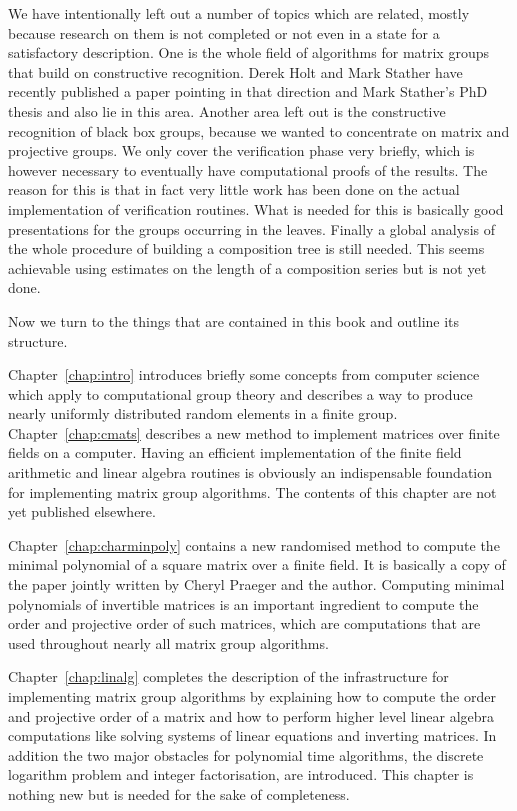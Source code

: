 We have intentionally left out a number of topics which are related, mostly
because research on them is not completed or not even in a state for a
satisfactory description. One is
the whole field of algorithms for matrix groups that build on constructive
recognition. Derek Holt and Mark Stather have recently published a paper
\cite{HoltStather} pointing in that direction and Mark Stather's PhD thesis
\cite{StatherPhd} and \cite{StatherSylow} also lie in this area. 
Another area left out is the
constructive recognition of black box groups, because we wanted to
concentrate on matrix and projective groups. We only cover the
verification phase very briefly, which is however necessary to eventually
have computational proofs of the results. The reason for this is that in
fact very little work has been done on the actual implementation of
verification routines. What is needed for this is basically good
presentations for the groups occurring in the leaves. 
%
Finally a global analysis of the
whole procedure of building a composition tree is still needed. This seems
achievable using estimates on the length of a composition series but is not
yet done.

Now we turn to the things that are contained in this book and
outline its structure. 

Chapter~\ref{chap:intro} introduces briefly some concepts from computer
science which apply to computational group theory and describes a
way to produce nearly uniformly distributed random elements in a
finite group. Chapter~\ref{chap:cmats} describes a new method to
implement matrices over finite fields on a computer. Having an efficient
implementation of the finite field arithmetic and linear algebra
routines is obviously an indispensable foundation for implementing
matrix group algorithms. The contents of this chapter are not yet
published elsewhere.

Chapter~\ref{chap:charminpoly} contains a new randomised method to
compute the minimal polynomial of a square matrix over a finite field.
It is basically a copy of the paper \cite{minpolypaper} jointly
written by Cheryl Praeger and the author. Computing minimal
polynomials of invertible matrices is an important ingredient to compute the
order and projective order of such matrices, which are computations
that are used throughout nearly all matrix group algorithms.

Chapter~\ref{chap:linalg} completes the description of the
infrastructure for implementing matrix group algorithms by explaining
how to compute the order and projective order of a matrix and how to
perform higher level linear algebra computations like solving systems
of linear equations and inverting matrices. In addition the two
major obstacles for polynomial time algorithms, the discrete logarithm
problem and integer factorisation, are introduced. This chapter is
nothing new but is needed for the sake of completeness.

